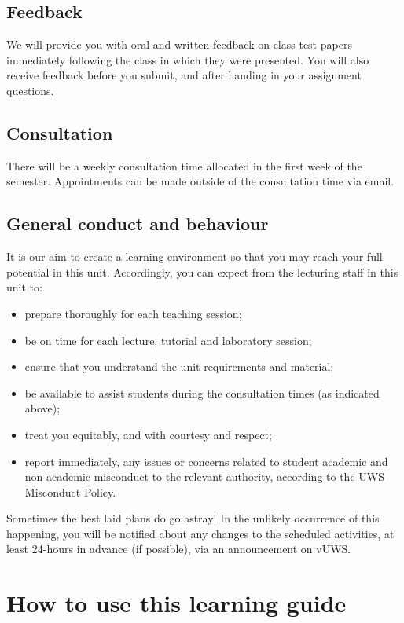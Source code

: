 \documentclass[a4paper,oneside]{book}
\newcommand{\vuws}{vUWS}
\begin{document}
\subsection*{Feedback}

We will provide you with oral and written feedback on class test papers
immediately following the class in which they were presented.  You
will also receive feedback before you submit, and after handing in
your assignment questions.

\subsection*{Consultation}

There will be a weekly consultation time allocated in the first week
of the semester. Appointments can be made outside of the consultation
time via email.


\subsection*{General conduct and behaviour}

It is our aim to create a learning environment so that you may
reach your full potential in this unit.  Accordingly, you can expect
from the lecturing staff in this unit to:
\begin{itemize}
\item prepare thoroughly for each teaching session;
\item be on time for each lecture, tutorial and laboratory session;
\item ensure that you understand the unit requirements and material;
\item be available to assist students during the consultation times
  (as indicated above);
\item treat you equitably, and with courtesy and respect;
\item report immediately, any issues or concerns related to student
  academic and non-academic misconduct to the relevant authority,
  according to the UWS Misconduct Policy.
\end{itemize}
Sometimes the best laid plans do go astray!  In the unlikely
occurrence of this happening, you will be notified about any changes
to the scheduled activities, at least 24-hours in advance (if
possible), via an announcement on \vuws.

\section{How to use this learning guide}
\end{document}
